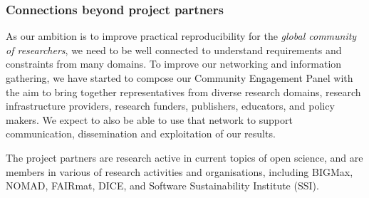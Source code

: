 
\subsubsection{Connections beyond project partners}

As our ambition is to improve practical reproducibility for the \emph{global
  community of researchers}, we need to be well connected to understand
requirements and constraints from many domains. To improve our networking and
information gathering, we have started to compose our Community Engagement Panel
 with the aim to bring together
representatives from diverse research domains, research infrastructure
providers, research funders, publishers, educators, and policy makers. We expect
to also be able to use that network to support communication, dissemination and
exploitation of our results.

The project partners are research active in current topics of open science, and
are members in various of research activities and organisations, including
BIGMax, NOMAD, FAIRmat, DICE, and Software Sustainability Institute (SSI).


% 
